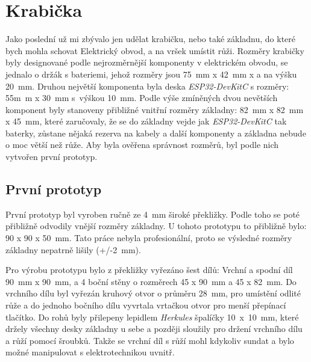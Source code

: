\chapter{Krabička}
Jako poslední už mi zbývalo jen udělat krabičku, nebo také základnu, do které bych mohla schovat Elektrický obvod, a na vršek umístit růži.
Rozměry krabičky byly designované podle nejrozměrnější komponenty v elektrickém obvodu, se jednalo o držák s bateriemi, jehož rozměry jsou 75~mm x 42~mm x a na výšku 20~mm. Druhou největší komponenta byla deska \textit{ESP32-DevKitC} s rozměry: 55m~m x 30~mm s~výškou 10~mm.
Podle výše zmíněných dvou nevětších komponent byly stanoveny přibližné vnitřní rozměry základny: 82~mm x 82~mm x 45~mm, které zaručovaly, že se do základny vejde jak \textit{ESP32-DevKitC} tak baterky, zůstane nějaká rezerva na kabely a další komponenty a základna nebude o moc větší než růže.  
Aby byla ověřena správnost rozměrů, byl podle nich vytvořen první prototyp.



\section{První prototyp}
První prototyp byl vyroben ručně ze 4~mm široké překližky. Podle toho se poté přibližně odvodily vnější rozměry základny. U tohoto prototypu to přibližně bylo: 90 x 90 x 50~mm. Tato práce nebyla profesionální, proto se výsledné rozměry základny nepatrně lišily (+/-2~mm).

Pro výrobu prototypu bylo z překližky vyřezáno šest dílů: Vrchní a spodní díl 90~mm x 90~mm, a 4 boční stěny o rozměrech 45 x 90~mm a 45 x 82~mm. Do vrchního dílu byl vyřezán kruhový otvor o průměru 28~mm, pro umístění odlité růže a do jednoho bočního dílu vyvrtala vrtačkou otvor pro menší přepínací tlačítko. Do rohů byly přilepeny lepidlem \textit{Herkules} špalíčky 10~x~10~mm, které držely všechny desky základny u sebe a později sloužily pro držení vrchního dílu a růží pomocí šroubků. Takže se vrchní díl s růží mohl kdykoliv sundat a bylo možné manipulovat s elektrotechnikou uvnitř.

